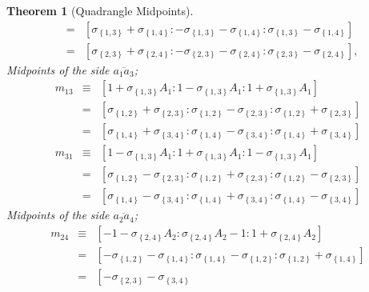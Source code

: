 \documentclass{unswthesis}
\newtheorem{theorem}{Theorem}
\begin{document}
\begin{theorem}[Quadrangle Midpoints]
\begin{eqnarray*}
&=&\left[ \sigma _{\left\{ 1,3\right\} }+\sigma _{\left\{ 1,4\right\}
}:-\sigma _{\left\{ 1,3\right\} }-\sigma _{\left\{ 1,4\right\} }:\sigma
_{\left\{ 1,3\right\} }-\sigma _{\left\{ 1,4\right\} }\right]  \\
&=&\left[ \sigma _{\left\{ 2,3\right\} }+\sigma _{\left\{ 2,4\right\}
}:-\sigma _{\left\{ 2,3\right\} }-\sigma _{\left\{ 2,4\right\} }:\sigma
_{\left\{ 2,3\right\} }-\sigma _{\left\{ 2,4\right\} }\right] ,
\end{eqnarray*}%
Midpoints of the side $\overline{a_{1}a_{3}}$;%
\begin{eqnarray*}
m_{13} &\equiv &\left[ 1+\sigma _{\left\{ 1,3\right\} }A_{1}:1-\sigma
_{\left\{ 1,3\right\} }A_{1}:1+\sigma _{\left\{ 1,3\right\} }A_{1}\right]  \\
&=&\left[ \sigma _{\left\{ 1,2\right\} }+\sigma _{\left\{ 2,3\right\}
}:\sigma _{\left\{ 1,2\right\} }-\sigma _{\left\{ 2,3\right\} }:\sigma
_{\left\{ 1,2\right\} }+\sigma _{\left\{ 2,3\right\} }\right]  \\
&=&\left[ \sigma _{\left\{ 1,4\right\} }+\sigma _{\left\{ 3,4\right\}
}:\sigma _{\left\{ 1,4\right\} }-\sigma _{\left\{ 3,4\right\} }:\sigma
_{\left\{ 1,4\right\} }+\sigma _{\left\{ 3,4\right\} }\right]  \\
m_{31} &\equiv &\left[ 1-\sigma _{\left\{ 1,3\right\} }A_{1}:1+\sigma
_{\left\{ 1,3\right\} }A_{1}:1-\sigma _{\left\{ 1,3\right\} }A_{1}\right]  \\
&=&\left[ \sigma _{\left\{ 1,2\right\} }-\sigma _{\left\{ 2,3\right\}
}:\sigma _{\left\{ 1,2\right\} }+\sigma _{\left\{ 2,3\right\} }:\sigma
_{\left\{ 1,2\right\} }-\sigma _{\left\{ 2,3\right\} }\right]  \\
&=&\left[ \sigma _{\left\{ 1,4\right\} }-\sigma _{\left\{ 3,4\right\}
}:\sigma _{\left\{ 1,4\right\} }+\sigma _{\left\{ 3,4\right\} }:\sigma
_{\left\{ 1,4\right\} }-\sigma _{\left\{ 3,4\right\} }\right] 
\end{eqnarray*}%
Midpoints of the side $\overline{a_{2}a_{4}}$;%
\begin{eqnarray*}
m_{24} &\equiv &\left[ -1-\sigma _{\left\{ 2,4\right\} }A_{2}:\sigma
_{\left\{ 2,4\right\} }A_{2}-1:1+\sigma _{\left\{ 2,4\right\} }A_{2}\right] 
\\
&=&\left[ -\sigma _{\left\{ 1,2\right\} }-\sigma _{\left\{ 1,4\right\}
}:\sigma _{\left\{ 1,4\right\} }-\sigma _{\left\{ 1,2\right\} }:\sigma
_{\left\{ 1,2\right\} }+\sigma _{\left\{ 1,4\right\} }\right]  \\
&=&\left[ -\sigma _{\left\{ 2,3\right\} }-\sigma _{\left\{ 3,4\right\}
}
\end{eqnarray*}
\end{theorem}
\end{document}
